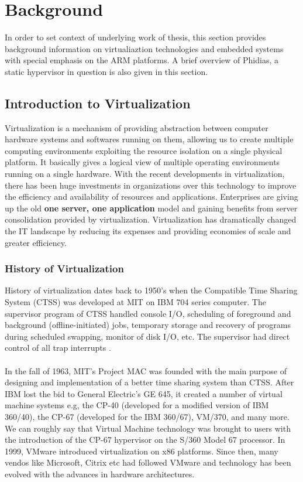 \chapter{Background \label{cha:chapter2}}

In order to set context of underlying work of thesis, this section provides background information on virtualiaztion technologies and embedded systems with special emphasis on the ARM platforms. A brief overview of Phidias, a static hypervisor in question is also given in this section.
\section{Introduction to Virtualization \label{sec:tech}}
Virtualization is a mechanism of providing abstraction between computer hardware systems and softwares running on them, allowing us to create multiple computing environments exploiting the resource isolation on a single physical platform. It basically gives a logical view of multiple operating environments running on a single hardware. With the recent developments in virtualization, there has been huge investments in organizations over this technology to improve the efficiency and availability of resources and applications. Enterprises are giving up the old \textbf{one server, one application} model and gaining benefits from server consolidation provided by virtualization. Virtualization has dramatically changed the IT landscape by reducing its expenses and providing economies of scale and greater efficiency.

\subsection{History of Virtualization\label{sec:history}}
History of virtualization dates back to 1950's when the Compatible Time Sharing System (CTSS) was developed at MIT on IBM 704 series computer. The supervisor program of CTSS handled console I/O, scheduling of foreground and background (offline-initiated) jobs, temporary storage and recovery of programs during scheduled swapping, monitor of disk I/O, etc. The supervisor had direct control of all trap interrupts \cite{introtousevirtualization}.\\
\\
In the fall of 1963, MIT's Project MAC was founded with the main purpose of designing and implementation of a better time sharing system than CTSS. After IBM lost the bid to General Electric's GE 645, it created a number of virtual machine systems e.g, the CP-40 (developed for a modified version of IBM 360/40), the CP-67 (developed for the IBM 360/67), VM/370, and many more. We can roughly say that Virtual Machine technology was brought to users with the introduction of the CP-67 hypervisor on the S/360 Model 67 processor. In 1999, VMware introduced virtualization on x86 platforms. Since then, many vendos like Microsoft, Citrix etc had followed VMware and technology has been evolved with the advances in hardware architectures. 
\\
\\
